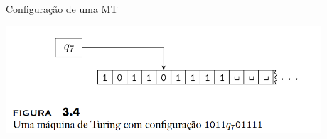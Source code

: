\documentclass[xcolor=dvipsnames,table]{beamer}
\begin{document}
	\begin{frame}{Configuração de uma MT}
		\begin{center}
			\includegraphics[height=4cm]{images/fig34.png}
		\end{center}
	\end{frame}
	
	\begin{frame}
		\titlepage
	\end{frame}
	
\end{document}
